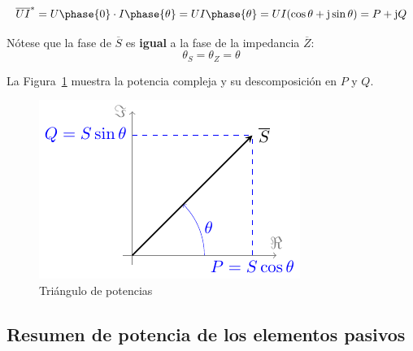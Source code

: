 \documentclass[11pt]{book} %
\begin{document}
\begin{itemize}
		\begin{equation*}
			\overline{U} \overline{I}^* = U\phase{0} \cdot I\phase{\theta} = UI\phase{\theta}= U I (\cos\theta + \mathrm{j} \sin\theta) = P + \mathrm{j} Q
		\end{equation*}
		\begin{remark}
			Nótese que la fase de $\overline{S}$ es \textbf{igual} a la fase de la impedancia $\overline{Z}$:
			\begin{equation*}
				\theta_S = \theta_Z = \theta
			\end{equation*}
		\end{remark}
		La Figura~\ref{fig.trianguloPotencias} muestra la potencia compleja y su descomposición en $P$ y $Q$.
		\begin{figure}[htbp]
			\centering
			\includegraphics{../figs/trianguloPotencias.pdf}
			\caption{Triángulo de potencias}
			\label{fig.trianguloPotencias}
		\end{figure}
	\end{itemize}
	
	
	\subsection{Resumen de potencia de los elementos pasivos}
	
\end{document}
